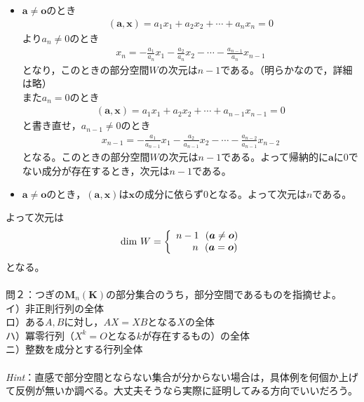 \documentclass[dvipdfmx,uplatex,11pt]{jsarticle}
\begin{document}
\begin{itemize}
\item $\bm{a} \neq \bm{o}のとき$
\begin{eqnarray*}
(\bm{a},\bm{x})=a_1x_1+a_2x_2+ \cdots +a_nx_n=0
\end{eqnarray*}
より$a_n \neq 0$のとき
\begin{eqnarray*}
x_n=-\frac{a_1}{a_n}x_{1}-\frac{a_2}{a_n}x_{2}- \cdots -\frac{a_{n-1}}{a_n}x_{n-1}
\end{eqnarray*}
となり，このときの部分空間$Wの次元はn-1$である。（明らかなので，詳細は略）\\
また$a_n=0$のとき
\begin{eqnarray*}
(\bm{a},\bm{x})=a_1x_1+a_2x_2+ \cdots +a_{n-1}x_{n-1}=0
\end{eqnarray*}
と書き直せ，$a_{n-1} \neq 0$のとき
\begin{eqnarray*}
x_{n-1}=-\frac{a_1}{a_{n-1}}x_{1}-\frac{a_2}{a_{n-1}}x_{2}- \cdots -\frac{a_{n-2}}{a_{n-1}}x_{n-2}
\end{eqnarray*}
となる。このときの部分空間$Wの次元はn-1である。$よって帰納的に$\bm{a}$に0でない成分が存在するとき，次元は$n-1$である。\\
\item $\bm{a} \neq \bm{o}のとき，(\bm{a},\bm{x})は\bm{x}の成分に依らず0となる。よって次元はnである。$
\end{itemize}
よって次元は
\begin{eqnarray*}
{\rm dim}~W=
\left\{
\begin{array}{l}
n-1~~(\bm{a} \neq \bm{o}) \\
~~~~~n~~(\bm{a}=\bm{o})
\end{array}
\right.
\end{eqnarray*}
となる。\\
\dotfill \\
\newpage
\noindent
%
問２：つぎの$\bm{M}_n(\bm{K})の部分集合のうち，部分空間であるものを指摘せよ。$\\
イ）非正則行列の全体\\
ロ）ある$A,B$に対し，$AX=XBとなるX$の全体\\
ハ）冪零行列（$X^k=Oとなるkが存在するもの$）の全体\\
ニ）整数を成分とする行列全体\\ \\
\textsl{Hint}：直感で部分空間とならない集合が分からない場合は，具体例を何個か上げて反例が無いか調べる。大丈夫そうなら実際に証明してみる方向でいいだろう。\\
\dotfill \\
\end{document}
